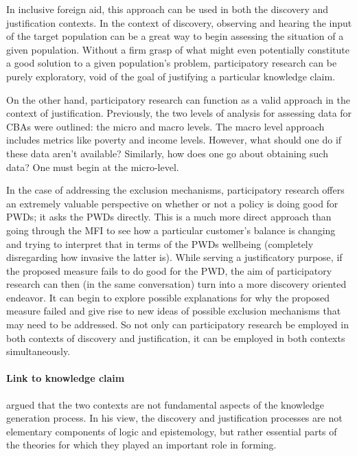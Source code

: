 \documentclass[a4paper]{article}
\begin{document}
In inclusive foreign aid, this approach can be used in both the discovery and
justification contexts. In the context of discovery, observing and hearing the
input of the target population can be a great way to begin assessing the
situation of a given population. Without a firm grasp of what might even
potentially constitute a good solution to a given population's problem,
participatory research can be purely exploratory, void of the goal of
justifying a particular knowledge claim.

On the other hand, participatory research can function as a valid approach in
the context of justification. Previously, the two levels of analysis for
assessing data for CBAs were outlined: the micro and macro levels. The macro
level approach includes metrics like poverty and income levels. However, what
should one do if these data aren't available? Similarly, how does one go about
obtaining such data? One must begin at the micro-level. 

In the case of addressing the exclusion mechanisms, participatory research
offers an extremely valuable perspective on whether or not a policy is doing
good for PWDs; it asks the PWDs directly. This is a much more direct approach
than going through the MFI to see how a particular customer's balance is
changing and trying to interpret that in terms of the PWDs wellbeing
(completely disregarding how invasive the latter is).  While serving a
justificatory purpose, if the proposed measure fails to do good for the PWD,
the aim of participatory research can then (in the same conversation) turn
into a more discovery oriented endeavor. It can begin to explore possible
explanations for why the proposed measure failed and give rise to new ideas of
possible exclusion mechanisms that may need to be addressed. So not only can
participatory research be employed in both contexts of discovery and
justification, it can be employed in both contexts simultaneously.


\paragraph{Link to knowledge claim}

\cite{kuhn2012structure} argued that the two contexts are not fundamental
aspects of the knowledge generation process. In his view, the discovery and
justification processes are not elementary components of logic and
epistemology, but rather essential parts of the theories for which they played
an important role in forming.
\end{document}
